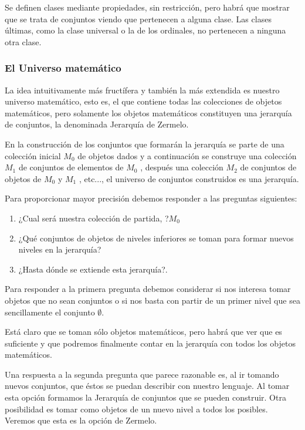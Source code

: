 Se definen clases mediante propiedades, sin restricción, pero habrá
que mostrar que se trata de conjuntos viendo que pertenecen a alguna
clase. Las clases últimas, como la clase universal o la de los ordinales,
no pertenecen a ninguna otra clase. 

\subsubsection{El Universo matemático}

La idea intuitivamente más fructífera y también la más extendida es
nuestro universo matemático, esto es, el que contiene todas las colecciones
de objetos matemáticos, pero solamente los objetos matemáticos constituyen
una jerarquía de conjuntos, la denominada Jerarquía de Zermelo. 

En la construcción de los conjuntos que formarán la jerarquía se parte
de una colección inicial $M_{0}$ de objetos dados y a continuación
se construye una colección $M_{1}$ de conjuntos de elementos de $M_{0}$
, después una colección $M_{2}$ de conjuntos de objetos de $M_{0}$
y $M_{1}$ , etc..., el universo de conjuntos construidos es una jerarquía.

Para proporcionar mayor precisión debemos responder a las preguntas
siguientes:
\begin{enumerate}
\item ¿Cual será nuestra colección de partida, ?$M_{0}$ 
\item ¿Qué conjuntos de objetos de niveles inferiores se toman para formar
nuevos niveles en la jerarquía? 
\item ¿Hasta dónde se extiende esta jerarquía?. 
\end{enumerate}
Para responder a la primera pregunta debemos considerar si nos interesa
tomar objetos que no sean conjuntos o si nos basta con partir de un
primer nivel que sea sencillamente el conjunto $\emptyset$.

Está claro que se toman sólo objetos matemáticos, pero habrá que ver
que es suficiente y que podremos finalmente contar en la jerarquía
con todos los objetos matemáticos.

Una respuesta a la segunda pregunta que parece razonable es, al ir
tomando nuevos conjuntos, que éstos se puedan describir con nuestro
lenguaje. Al tomar esta opción formamos la Jerarquía de conjuntos
que se pueden construir. Otra posibilidad es tomar como objetos de
un nuevo nivel a todos los posibles. Veremos que esta es la opción
de Zermelo. 

